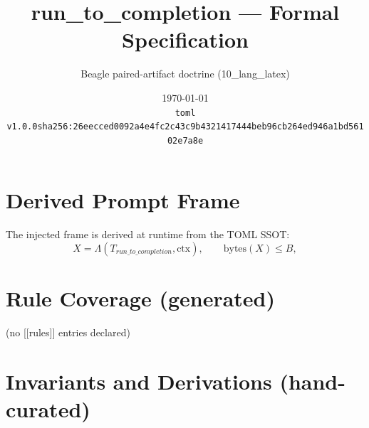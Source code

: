 \documentclass[11pt]{article}
\title{run\_to\_completion --- Formal Specification}
\author{Beagle paired-artifact doctrine (10\_lang\_latex)}
\date{\today\\ \texttt{toml v1.0.0\quad sha256:26eecced0092a4e4fc2c43c9b4321417444beb96cb264ed946a1bd56102e7a8e}}
\begin{document}
\maketitle

\section{Derived Prompt Frame}
The injected frame is derived at runtime from the TOML SSOT:
\begin{equation}
  X = \Lambda(T_{run\_to\_completion}, \mathrm{ctx}), \qquad \mathrm{bytes}(X) \le B,
  \label{lbl:derive-frame}
\end{equation}

\section{Rule Coverage (generated)}
(no [[rules]] entries declared)

\section{Invariants and Derivations (hand-curated)}
\end{document}
